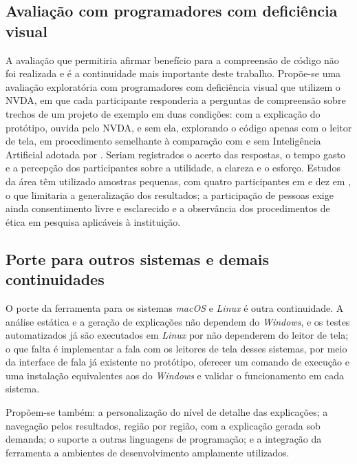\documentclass[
    12pt,                   %
    openright,              %
    oneside,                %
    a4paper,                %
    sumario=tradicional,    %
    english,                %
    brazil,                 %
    ]{abntex2}
\begin{document}
\subsection{Avaliação com programadores com deficiência visual}\label{sec:usuarios}

A avaliação que permitiria afirmar benefício para a compreensão de código não foi realizada e é a continuidade mais importante deste trabalho. Propõe-se uma avaliação exploratória com programadores com deficiência visual que utilizem o NVDA, em que cada participante responderia a perguntas de compreensão sobre trechos de um projeto de exemplo em duas condições: com a explicação do protótipo, ouvida pelo NVDA, e sem ela, explorando o código apenas com o leitor de tela, em procedimento semelhante à comparação com e sem Inteligência Artificial adotada por \textcite{latinoware34224}. Seriam registrados o acerto das respostas, o tempo gasto e a percepção dos participantes sobre a utilidade, a clareza e o esforço. Estudos da área têm utilizado amostras pequenas, com quatro participantes em \textcite{latinoware34224} e dez em \textcite{latinoware20457}, o que limitaria a generalização dos resultados; a participação de pessoas exige ainda consentimento livre e esclarecido e a observância dos procedimentos de ética em pesquisa aplicáveis à instituição.

\subsection{Porte para outros sistemas e demais continuidades}

O porte da ferramenta para os sistemas \textit{macOS} e \textit{Linux} é outra continuidade. A análise estática e a geração de explicações não dependem do \textit{Windows}, e os testes automatizados já são executados em \textit{Linux} por não dependerem do leitor de tela; o que falta é implementar a fala com os leitores de tela desses sistemas, por meio da interface de fala já existente no protótipo, oferecer um comando de execução e uma instalação equivalentes aos do \textit{Windows} e validar o funcionamento em cada sistema.

Propõem-se também: a personalização do nível de detalhe das explicações; a navegação pelos resultados, região por região, com a explicação gerada sob demanda; o suporte a outras linguagens de programação; e a integração da ferramenta a ambientes de desenvolvimento amplamente utilizados.
\end{document}

